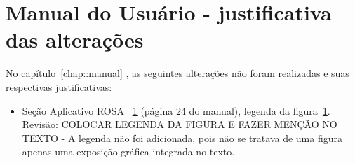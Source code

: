 \section{Manual do Usuário - justificativa das alterações}


No capítulo~\ref{chap::manual} , as seguintes alterações
não foram realizadas e suas respectivas justificativas:

\begin{itemize}
  \item Seção Aplicativo ROSA ~\ref{} (página 24 do manual), legenda
  da figura~\ref{}.
  Revisão:
  COLOCAR LEGENDA DA FIGURA E FAZER MENÇÃO NO TEXTO - A legenda não foi
  adicionada, pois não se tratava de uma figura apenas uma exposição gráfica
  integrada no texto.
\end{itemize}
